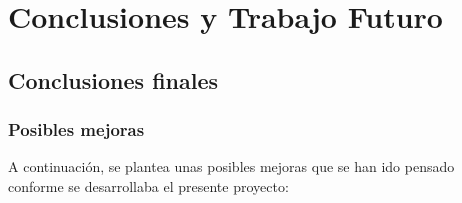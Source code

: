 \documentclass[11pt,fleqn]{book} %
\begin{document}
%
%
%


\part{Conclusiones y Trabajo Futuro}

\chapter{Conclusiones finales}

\section{Posibles mejoras}

A continuación, se plantea unas posibles mejoras que se han ido pensado conforme se desarrollaba el presente proyecto: \\
\end{document}
